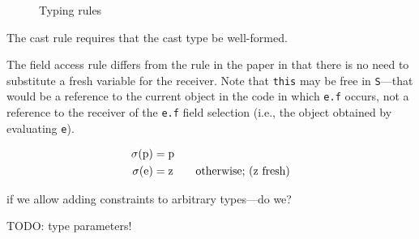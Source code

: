 \documentclass[preprint,nocopyrightspace,9pt]{sigplanconf}
\begin{document}
\begin{figure}

\caption{Typing rules}
\label{fig:typing}
\end{figure}

The cast rule
requires that the cast type be well-formed. 



The field access rule 
differs from the rule in the paper in that there is no need to
substitute a fresh variable for the receiver. Note that {\tt this} may be free
in {\tt S}---that would be a reference to the current object in the code in
which {\tt e.f} occurs, not a reference to the receiver of the {\tt e.f} field
selection (i.e., the object obtained by evaluating {\tt e}).

\begin{align*}
\sigma(\Xcd{p}) &= \Xcd{p} \\
\sigma(\Xcd{e}) &= \Xcd{z} \qquad \mbox{otherwise; (\Xcd{z} fresh)} \\
\end{align*}

\noindent
if we allow adding constraints to arbitrary types---do we?

TODO: type parameters!
\end{document}
